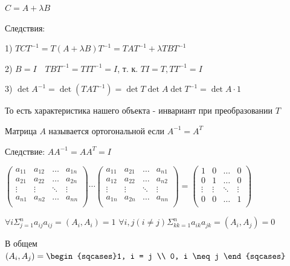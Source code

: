 \documentclass[12pt]{article}
\begin{document}
    \Nota $C = A + \lambda B$

    Следствия:

    1) $\displaystyle TCT^{-1} = T (A + \lambda B) T^{-1} = T A T^{-1} + \lambda T B T^{-1}$

    2) $\displaystyle B = I \quad T B T^{-1} = T I T^{-1} = I$, т. к. $\displaystyle TI = T, T T^{-1} = I$

    3) $\displaystyle \det A^{-1} = \det (T A T^{-1}) = \det T \det A \det T^{-1} = \det A \cdot 1$

    \Nota То есть характеристика нашего объекта - инвариант при преобразовании $T$

    \Def Матрица $A$ называется ортогональной если $\displaystyle A^{-1} = A^T$

    Следствие: $\displaystyle AA^{-1} = AA^T = I$

    $\displaystyle \begin{pmatrix}
         a_{11} & a_{12} & \dots & a_{1n} \\
         a_{21} & a_{22} & \dots & a_{2n} \\
         \vdots & \vdots & \ddots & \vdots \\
         a_{n1} & a_{n2} & \dots & a_{nn} \\
    \end{pmatrix} \cdots \begin{pmatrix}
         a_{11} & a_{21} & \dots & a_{n1} \\
         a_{12} & a_{22} & \dots & a_{n2} \\
         \vdots & \vdots & \ddots & \vdots \\
         a_{1n} & a_{2n} & \dots & a_{nn} \\
    \end{pmatrix} = \begin{pmatrix}
         1 & 0 & \dots & 0 \\
         0 & 1 & \dots & 0 \\
         \vdots & \vdots & \ddots & \vdots \\
         0 & 0 & \dots & 1 \\
    \end{pmatrix}$

    $\displaystyle \forall i \Sigma^n_{j=1} a_{ij} a_{ij} = (A_i, A_i) = 1$
    $\displaystyle \forall i, j (i \neq j) \Sigma^n_{kk=1} a_{ik} a_{jk} = (A_i, A_j) = 0$

    В общем $\displaystyle (A_i, A_j) = \begin{sqcases}1, i = j \\ 0, i \neq j \end{sqcases}$
\end{document}
